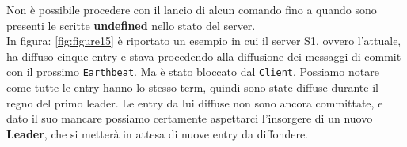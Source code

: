 Non è possibile procedere con il lancio di alcun comando fino a quando sono presenti le scritte \textbf{undefined} nello stato del server.\\

In figura: \ref{fig:figure15} è riportato un esempio in cui il server S1, ovvero l'attuale, ha diffuso cinque entry e stava procedendo alla diffusione dei messaggi di commit con il prossimo \texttt{Earthbeat}. Ma è stato bloccato dal \texttt{Client}.
Possiamo notare come tutte le entry hanno lo stesso term, quindi sono state diffuse durante il regno del primo leader.
Le entry da lui diffuse non sono ancora committate, e dato il suo mancare possiamo certamente aspettarci l'insorgere di un nuovo \textbf{Leader}, che si metterà in attesa di nuove entry da diffondere.
